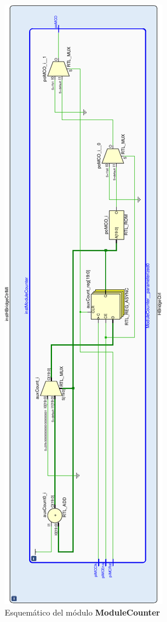 \documentclass[12pt]{article}
\begin{document}
\begin{figure}[H]
    \centering
    \includegraphics[angle=270, width=\textwidth]{ModCounter-crop}
    \caption{Esquemático del módulo \textbf{ModuleCounter}}
\end{figure}
\end{document}
